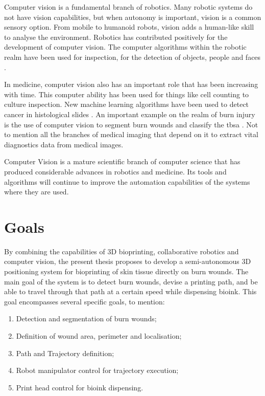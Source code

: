 Computer vision is a fundamental branch of robotics. Many robotic systems do not have vision capabilities, but when autonomy is important, vision is a common sensory option. From mobile to humanoid robots, vision adds a human-like skill to analyse the environment. Robotics has contributed positively for the development of computer vision. The computer algorithms within the robotic realm have been used for inspection, for the detection of objects, people and faces \cite{Fang2018_facial_detection}.

In medicine, computer vision also has an important role that has been increasing with time. This computer ability has been used for things like cell counting \cite{He2019_cell_counting} to culture inspection. New machine learning algorithms have been used to detect cancer in histological slides \cite{Araujo2017_classification_breast_cancer_histology}. An important example on the realm of burn injury is the use of computer vision to segment burn wounds and classify the \gls{tbsa} \cite{Wantanajittikul2012_automatic_segmentation_degree_identification_burn_wounds}. Not to mention all the branches of medical imaging that depend on it to extract vital diagnostics data from medical images.

Computer Vision is a mature scientific branch of computer science that has produced considerable advances in robotics and medicine. Its tools and algorithms will continue to improve the automation capabilities of the systems where they are used.



\section{Goals} %
\label{sec:goals}

By combining the capabilities of 3D bioprinting, collaborative robotics and computer vision, the present thesis proposes to develop a semi-autonomous 3D positioning system for bioprinting of skin tissue directly on burn wounds. The main goal of the system is to detect burn wounds, devise a printing path, and be able to travel through that path at a certain speed while dispensing bioink. This goal encompasses several specific goals, to mention:

\begin{enumerate}
    \item Detection and segmentation of burn wounds;
    \item Definition of wound area, perimeter and localisation;
    \item Path and Trajectory definition;
    \item Robot manipulator control for trajectory execution;
    \item Print head control for bioink dispensing.
\end{enumerate}

